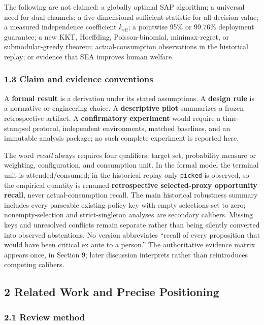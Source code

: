 \documentclass[
  11pt]{article}
\begin{document}
The following are not claimed: a globally optimal SAP algorithm; a
universal need for dual channels; a five-dimensional sufficient
statistic for all decision value; a measured independence coefficient
\(k_{\mathrm{eff}}\); a pointwise 95\% or 99.76\% deployment guarantee;
a new KKT, Hoeffding, Poisson-binomial, minimax-regret, or
submodular-greedy theorem; actual-consumption observations in the
historical replay; or evidence that SEA improves human welfare.

\subsubsection{1.3 Claim and evidence
conventions}\label{claim-and-evidence-conventions}

A \textbf{formal result} is a derivation under its stated assumptions. A
\textbf{design rule} is a normative or engineering choice. A
\textbf{descriptive pilot} summarizes a frozen retrospective artifact. A
\textbf{confirmatory experiment} would require a time-stamped protocol,
independent environments, matched baselines, and an immutable analysis
package; no such complete experiment is reported here.

The word \emph{recall} always requires four qualifiers: target set,
probability measure or weighting, configuration, and consumption unit.
In the formal model the terminal unit is attended/consumed; in the
historical replay only \texttt{picked} is observed, so the empirical
quantity is renamed \textbf{retrospective selected-proxy opportunity
recall}, never actual-consumption recall. The main historical robustness
summary includes every parseable existing policy key with empty
selections set to zero; nonempty-selection and strict-singleton analyses
are secondary calibers. Missing keys and unresolved conflicts remain
separate rather than being silently converted into observed abstentions.
No version abbreviates ``recall of every proposition that would have
been critical ex ante to a person.'' The authoritative evidence matrix
appears once, in Section 9; later discussion interprets rather than
reintroduces competing calibers.

\subsection{2 Related Work and Precise
Positioning}\label{related-work-and-precise-positioning}

\subsubsection{2.1 Review method}\label{review-method}
\end{document}
